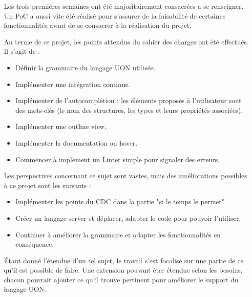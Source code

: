 Les trois premières semaines ont été majoritairement consacrées a se renseigner.
Un PoC a aussi vite été réalisé pour s'assurer de la faisabilité de certaines fonctionnalités avant de se consacrer à la réalisation du projet.

Au terme de ce projet, les points attendus du cahier des charges ont été effectués. Il s'agit de :
\begin{itemize}
    \item Définir la grammaire du langage UON utilisée.
    \item Implémenter une intégration continue.
    \item Implémenter de l'autocomplétion : les éléments proposés à l'utilisateur sont des mots-clés (le nom des structures, les types et leurs propriétés associées).
    \item Implémenter une outline view.
    \item Implémenter la documentation on hover.
    \item Commencer à implement un Linter simple pour signaler des erreurs.
\end{itemize}

Les perspectives concernant ce sujet sont vastes, mais des améliorations possibles à ce projet sont les suivants :
\begin{itemize}
    \item Implémenter les points du CDC dans la partie "si le temps le permet"
    \item Créer un langage server et déplacer, adapter le code pour pouvoir l'utiliser.
    \item Continuer à améliorer la grammaire et adapter les fonctionnalités en conséquence.
\end{itemize}

Étant donné l'étendue d'un tel sujet, le travail s'est focalisé sur une partie de ce qu'il est possible de faire.
Une extension pouvant être étendue selon les besoins, chacun pourrait ajouter ce qu'il trouve pertinent pour améliorer le support du langage UON.

